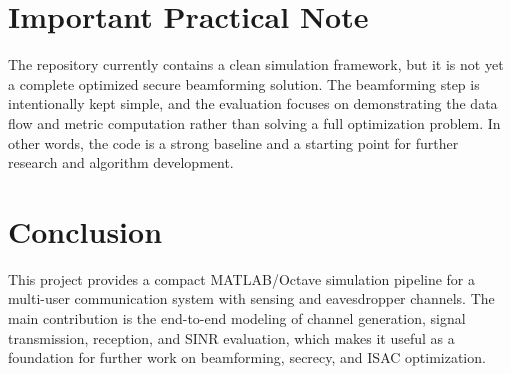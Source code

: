 \documentclass[12pt]{article}
\begin{document}
\section{Important Practical Note}
The repository currently contains a clean simulation framework, but it is not yet a complete optimized secure beamforming solution. The beamforming step is intentionally kept simple, and the evaluation focuses on demonstrating the data flow and metric computation rather than solving a full optimization problem. In other words, the code is a strong baseline and a starting point for further research and algorithm development.

\section{Conclusion}
This project provides a compact MATLAB/Octave simulation pipeline for a multi-user communication system with sensing and eavesdropper channels. The main contribution is the end-to-end modeling of channel generation, signal transmission, reception, and SINR evaluation, which makes it useful as a foundation for further work on beamforming, secrecy, and ISAC optimization.
\end{document}
